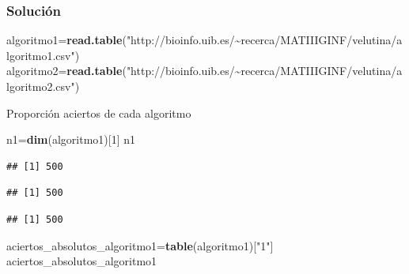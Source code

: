 \documentclass[
]{article}
\newenvironment{Shaded}{\begin{snugshade}}{\end{snugshade}}
\newcommand{\DecValTok}[1]{\textcolor[rgb]{0.00,0.00,0.81}{#1}}
\newcommand{\KeywordTok}[1]{\textcolor[rgb]{0.13,0.29,0.53}{\textbf{#1}}}
\newcommand{\NormalTok}[1]{#1}
\newcommand{\OperatorTok}[1]{\textcolor[rgb]{0.81,0.36,0.00}{\textbf{#1}}}
\newcommand{\StringTok}[1]{\textcolor[rgb]{0.31,0.60,0.02}{#1}}
\begin{document}
\hypertarget{soluciuxf3n-7}{%
\subsubsection{Solución}\label{soluciuxf3n-7}}

\begin{Shaded}
\begin{Highlighting}[]
\NormalTok{algoritmo1=}\KeywordTok{read.table}\NormalTok{(}\StringTok{"http://bioinfo.uib.es/\textasciitilde{}recerca/MATIIIGINF/velutina/algoritmo1.csv"}\NormalTok{)}
\NormalTok{algoritmo2=}\KeywordTok{read.table}\NormalTok{(}\StringTok{"http://bioinfo.uib.es/\textasciitilde{}recerca/MATIIIGINF/velutina/algoritmo2.csv"}\NormalTok{)}
\end{Highlighting}
\end{Shaded}

Proporción aciertos de cada algoritmo

\begin{Shaded}
\begin{Highlighting}[]
\NormalTok{n1=}\KeywordTok{dim}\NormalTok{(algoritmo1)[}\DecValTok{1}\NormalTok{]}
\NormalTok{n1}
\end{Highlighting}
\end{Shaded}

\begin{verbatim}
## [1] 500
\end{verbatim}

\begin{Shaded}
\end{Shaded}

\begin{verbatim}
## [1] 500
\end{verbatim}

\begin{Shaded}
\end{Shaded}

\begin{verbatim}
## [1] 500
\end{verbatim}

\begin{Shaded}
\begin{Highlighting}[]
\NormalTok{aciertos\_absolutos\_algoritmo1=}\KeywordTok{table}\NormalTok{(algoritmo1)[}\StringTok{"1"}\NormalTok{]}
\NormalTok{aciertos\_absolutos\_algoritmo1}
\end{Highlighting}
\end{Shaded}
\end{document}
